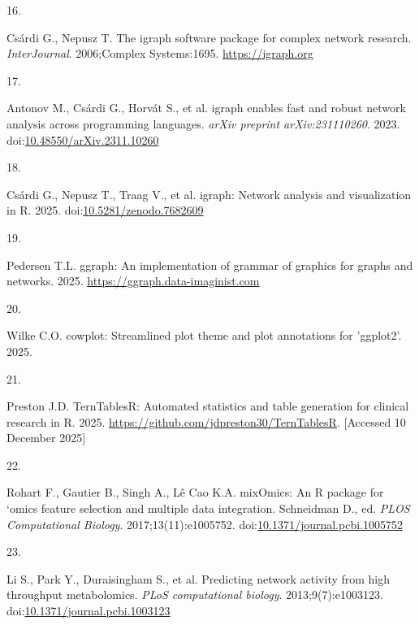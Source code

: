 \documentclass[
]{article}
\newlength{\cslhangindent}
\newlength{\csllabelwidth}
\newenvironment{CSLReferences}[2] %
 {\begin{list}{}{%
  \setlength{\itemindent}{0pt}
  \setlength{\leftmargin}{0pt}
  \setlength{\parsep}{0pt}
  \ifodd #1
   \setlength{\leftmargin}{\cslhangindent}
   \setlength{\itemindent}{-1\cslhangindent}
  \fi
  \setlength{\itemsep}{#2\baselineskip}}}
 {\end{list}}
\newcommand{\CSLLeftMargin}[1]{\parbox[t]{\csllabelwidth}{\strut#1\strut}}
\newcommand{\CSLRightInline}[1]{\parbox[t]{\linewidth - \csllabelwidth}{\strut#1\strut}}
\begin{document}
\begin{CSLReferences}{0}{1}
\CSLLeftMargin{16. }%
\CSLRightInline{Csárdi G., Nepusz T. The igraph software package for
complex network research. \emph{InterJournal}. 2006;Complex
Systems:1695. \url{https://igraph.org}}

\CSLLeftMargin{17. }%
\CSLRightInline{Antonov M., Csárdi G., Horvát S., et al. {igraph}
enables fast and robust network analysis across programming languages.
\emph{arXiv preprint arXiv:231110260}. 2023.
doi:\href{https://doi.org/10.48550/arXiv.2311.10260}{10.48550/arXiv.2311.10260}}

\CSLLeftMargin{18. }%
\CSLRightInline{Csárdi G., Nepusz T., Traag V., et al. {igraph}: Network
analysis and visualization in {R}. 2025.
doi:\href{https://doi.org/10.5281/zenodo.7682609}{10.5281/zenodo.7682609}}

\CSLLeftMargin{19. }%
\CSLRightInline{Pedersen T.L. {ggraph}: An implementation of grammar of
graphics for graphs and networks. 2025.
\url{https://ggraph.data-imaginist.com}}

\CSLLeftMargin{20. }%
\CSLRightInline{Wilke C.O. {cowplot}: Streamlined plot theme and plot
annotations for {'}ggplot2{'}. 2025.}

\CSLLeftMargin{21. }%
\CSLRightInline{Preston J.D. {TernTablesR}: Automated statistics and
table generation for clinical research in {R}. 2025.
\url{https://github.com/jdpreston30/TernTablesR}. {[}Accessed 10
December 2025{]}}

\CSLLeftMargin{22. }%
\CSLRightInline{Rohart F., Gautier B., Singh A., Lê Cao K.A. {mixOmics}:
An {R} package for `omics feature selection and multiple data
integration. Schneidman D., ed. \emph{PLOS Computational Biology}.
2017;13(11):e1005752.
doi:\href{https://doi.org/10.1371/journal.pcbi.1005752}{10.1371/journal.pcbi.1005752}}

\CSLLeftMargin{23. }%
\CSLRightInline{Li S., Park Y., Duraisingham S., et al. Predicting
network activity from high throughput metabolomics. \emph{PLoS
computational biology}. 2013;9(7):e1003123.
doi:\href{https://doi.org/10.1371/journal.pcbi.1003123}{10.1371/journal.pcbi.1003123}}

\end{CSLReferences}
\end{document}
